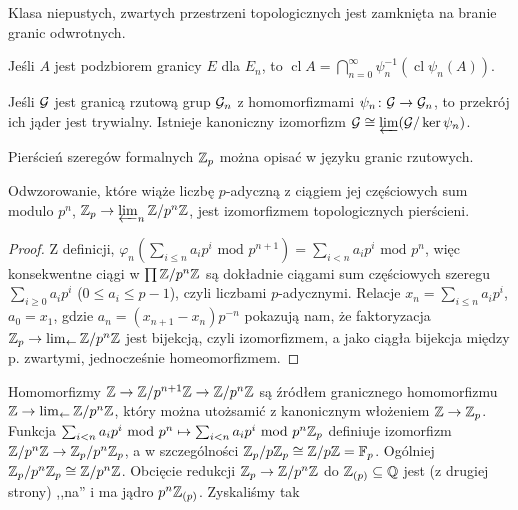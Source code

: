 \begin{fakt}
	Klasa niepustych, zwartych przestrzeni topologicznych jest zamknięta na branie granic odwrotnych.
\end{fakt}

\begin{fakt}
	Jeśli $A$ jest podzbiorem granicy $E$ dla $E_n$, to $\operatorname{cl} A = \bigcap_{n=0}^\infty \psi_n^{-1} (\operatorname{cl} \psi_n (A))$.
\end{fakt}

\begin{fakt}
	Jeśli  $\mathcal G$ jest granicą rzutową grup $\mathcal G_n$ z homomorfizmami $\psi_n \colon \mathcal G \to \mathcal G_n$, to przekrój ich jąder jest trywialny.
	Istnieje kanoniczny izomorfizm $\mathcal G \cong \varprojlim (\mathcal G / \ker \psi_n)$.
\end{fakt}

Pierścień szeregów formalnych $\mathbb Z_p$ można opisać w języku granic rzutowych.

\begin{fakt}
	Odwzorowanie,  które wiąże liczbę $p$-adyczną z ciągiem jej częściowych sum modulo ${p^n}$, $\mathbb Z_p \to \varprojlim_n \mathbb Z/p^n\mathbb Z$, jest izomorfizmem topologicznych pierścieni.
\end{fakt}

\begin{proof}
	Z definicji, $\varphi_n (\sum_{i \le n} a_ip^i \mbox{ mod } {p^{n+1}}) = \sum_{i<n} a_ip^i \mbox{ mod } {p^n}$, więc konsekwentne ciągi w $\prod \mathbb Z/p^n\mathbb Z$ są dokładnie ciągami sum częściowych szeregu $\sum_{i \ge 0} a_i p^i$ ($0 \le a_i\le p-1$), czyli liczbami $p$-adycznymi.
	Relacje $x_n = \sum_{i \le n} a_ip^i$, $a_0 = x_1$, gdzie $a_n = (x_{n+1} - x_n)p^{-n}$ pokazują nam, że faktoryzacja $\mathbb Z_p \to \lim_{\leftarrow} \mathbb Z/p^n\mathbb Z$ jest bijekcją, czyli izomorfizmem, a jako ciągła bijekcja między p. zwartymi, jednocześnie homeomorfizmem.
\end{proof}

Homomorfizmy $\mathbb Z \to \mathbb Z/p^{n+1} \mathbb Z \to \mathbb Z/p^n\mathbb Z$ są źródłem granicznego homomorfizmu $\mathbb Z \to \lim_{\leftarrow} \mathbb Z/p^n\mathbb Z$, który można utożsamić z kanonicznym włożeniem $\mathbb Z \to \mathbb Z_p$.
Funkcja $\sum_{i < n} a_ip^i \mbox{ mod } {p^n} \mapsto \sum_{i<n} a_ip^i \mbox{ mod } {p^n \mathbb Z_p}$ definiuje izomorfizm $\mathbb Z/p^n\mathbb Z \to \mathbb Z_p/p^n\mathbb Z_p$, a w szczególności $\mathbb Z_p / p\mathbb Z_p \cong \mathbb Z/p\mathbb Z = \mathbb F_p$.
Ogólniej $\mathbb Z_p/p^n \mathbb Z_p \cong \mathbb Z/p^n\mathbb Z$.
Obcięcie redukcji $\mathbb Z_p \to \mathbb Z/p^n\mathbb Z$ do $\mathbb Z_{(p)} \subseteq \mathbb Q$ jest (z drugiej strony) ,,na'' i ma jądro $p^n\mathbb Z_{(p)}$.
Zyskaliśmy tak

